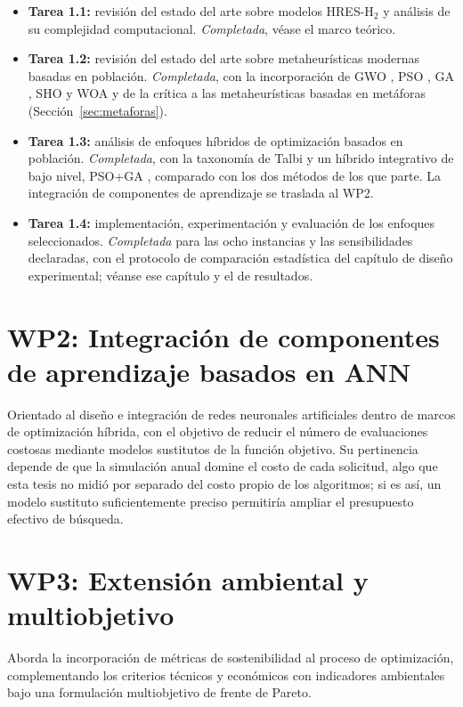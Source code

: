 \begin{itemize}
    \item \textbf{Tarea 1.1:} revisión del estado del arte sobre modelos HRES-H$_2$ y análisis de su complejidad computacional. \textit{Completada}, véase el marco teórico.
    \item \textbf{Tarea 1.2:} revisión del estado del arte sobre metaheurísticas modernas basadas en población. \textit{Completada}, con la incorporación de GWO \cite{Mirjalili2014GWO}, PSO \cite{Kennedy1995PSO}, GA \cite{Goldberg1989GA}, SHO \cite{Dhiman2017SHO} y WOA \cite{Mirjalili2016WOA} y de la crítica a las metaheurísticas basadas en metáforas (Sección~\ref{sec:metaforas}).
    \item \textbf{Tarea 1.3:} análisis de enfoques híbridos de optimización basados en población. \textit{Completada}, con la taxonomía de Talbi \cite{Talbi2002Taxonomy} y un híbrido integrativo de bajo nivel, PSO+GA \cite{Kao2008HybridGAPSO}, comparado con los dos métodos de los que parte. La integración de componentes de aprendizaje se traslada al WP2.
    \item \textbf{Tarea 1.4:} implementación, experimentación y evaluación de los enfoques seleccionados. \textit{Completada} para las ocho instancias y las sensibilidades declaradas, con el protocolo de comparación estadística del capítulo de diseño experimental; véanse ese capítulo y el de resultados.
\end{itemize}

\section{WP2: Integración de componentes de aprendizaje basados en ANN}

Orientado al diseño e integración de redes neuronales artificiales dentro de marcos de optimización híbrida, con el objetivo de reducir el número de evaluaciones costosas mediante modelos sustitutos de la función objetivo. Su pertinencia depende de que la simulación anual domine el costo de cada solicitud, algo que esta tesis no midió por separado del costo propio de los algoritmos; si es así, un modelo sustituto suficientemente preciso permitiría ampliar el presupuesto efectivo de búsqueda.

\section{WP3: Extensión ambiental y multiobjetivo}

Aborda la incorporación de métricas de sostenibilidad al proceso de optimización, complementando los criterios técnicos y económicos con indicadores ambientales bajo una formulación multiobjetivo de frente de Pareto.

